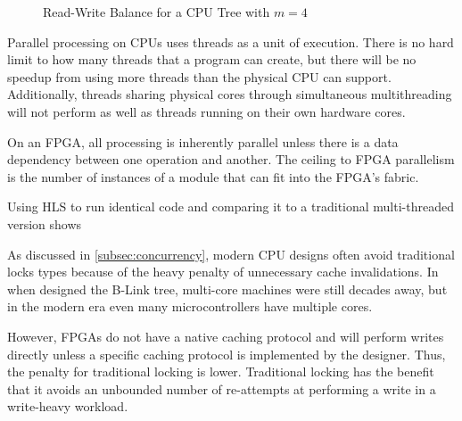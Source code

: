 
\begin{figure}[H]
	\centering
	
	\caption{Read-Write Balance for a CPU Tree with $m=4$}
	\label{fig:rw-balance}
\end{figure}



Parallel processing on CPUs uses threads as a unit of execution. There is no
hard limit to how many threads that a program can create, but there will be no
speedup from using more threads than the physical CPU can support. Additionally,
threads sharing physical cores through simultaneous multithreading will not
perform as well as threads running on their own hardware cores.

On an FPGA, all processing is inherently parallel unless there is a data
dependency between one operation and another. The ceiling to FPGA parallelism is
the number of instances of a module that can fit into the FPGA's fabric.

Using HLS to run identical code and comparing it to a traditional multi-threaded
version shows \todo{\ldots}



As discussed in \autoref{subsec:concurrency}, modern CPU designs often avoid
traditional locks types because of the heavy penalty of unnecessary cache
invalidations. In \citeyear{b-link} when \citeauthor{b-link} designed the B-Link
tree, multi-core machines were still decades away, but in the modern era even
many microcontrollers have multiple cores.

However, FPGAs do not have a native caching protocol and will perform writes
directly unless a specific caching protocol is implemented by the designer.
Thus, the penalty for traditional locking is lower. Traditional locking has the
benefit that it avoids an unbounded number of re-attempts at performing a write
in a write-heavy workload.




